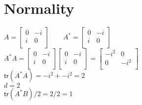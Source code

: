 \documentclass{iansnotes}
\begin{document}
\section{Normality}
$A = \begin{bmatrix}
  0 & -i \\
  i & 0 \\
\end{bmatrix} \qquad
A^* = \begin{bmatrix}
  0 & -i \\
  i &  0 \\
\end{bmatrix}$ \\[4mm]
\noindent$A^* A = \begin{bmatrix}
  0 & -i \\
  i & 0 \\
\end{bmatrix}\begin{bmatrix}
  0 & -i \\
  i & 0 \\
\end{bmatrix}=\begin{bmatrix}
  -i^2 &  0   \\
  0    & -i^2 \\
\end{bmatrix}$ \\[4mm]
$\textsf{tr}(A^*A) = -i^2 + -i^2 = 2$ \\[2mm]
$d = 2$ \\[2mm]
$\textsf{tr}(A^*B)/2 = 2/2 = 1$
\end{document}
